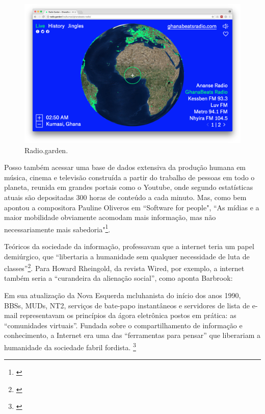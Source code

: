 \begin{figure}[htb]
    \caption{\label{radiogarden} Radio.garden.}
    \begin{center}
        \includegraphics[width=1\linewidth]{pictures/radio_garden_2018-06-10.png}
    \end{center}
    
\end{figure}

Posso também acessar uma base de dados extensiva da produção humana em música, cinema e televisão construída a partir do trabalho de pessoas em todo o planeta, reunida em grandes portais como o Youtube, onde segundo estatísticas atuais são depositadas 300 horas de conteúdo a cada minuto. Mas, como bem apontou a compositora Pauline Oliveros em ``Software for people", ``As mídias e a maior mobilidade obviamente acomodam mais informação, mas não necessariamente mais sabedoria"\footnote{\cite[p. 179]{Oliveros2012}}. 

Teóricos da sociedade da informação, professavam que a internet teria um papel demiúrgico, que ``libertaria a humanidade sem qualquer necessidade de luta de classes''\footnote{\cite[p. 275]{Barbrook2009}}. Para Howard Rheingold, da revista Wired, por exemplo, a internet também seria a ``curandeira da alienação social'', como aponta Barbrook:


\begin{citacao}
Em sua atualização da Nova Esquerda mcluhanista do início dos anos 1990, BBSs, MUDs, NT2, serviços de bate-papo instantâneos e servidores de lista de e-mail representavam os princípios da ágora eletrônica postos em prática: as “comunidades virtuais”. Fundada sobre o compartilhamento de informação e conhecimento, a Internet era uma das “ferramentas para pensar” que liberariam a humanidade da sociedade fabril fordista. \footnote{\cite[p. 350]{Barbrook2009}}
\end{citacao}

